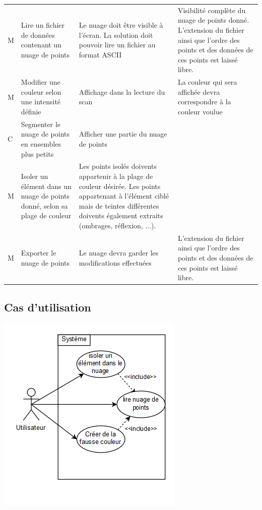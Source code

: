 \documentclass[12pt,titlepage,french]{article}
\begin{document}
\noindent\begin{tabu} to \toprule
     &&&\\\toprule
M &Lire un fichier de données contenant un nuage de points
& Le nuage doit être visible à l'écran. La solution doit pouvoir lire un fichier au format ASCII
& Visibilité complète du nuage de points donné. L'extension du fichier ainsi que l'ordre des points et des données de ces points est laissé libre.\\\midrule
M & Modifier une couleur selon une intensité définie
& Affichage dans la lecture du scan
& La couleur qui sera affichée devra correspondre à la couleur voulue\\\midrule
C & Segmenter le nuage de points en ensembles plus petits
& Afficher une partie du nuage de points
& \\\midrule
M &Isoler un élément dans un nuage de points donné, selon sa plage de couleur 
& Les points isolés doivents appartenir à la plage de couleur désirée.
Les points appartenant à l'élément ciblé mais de teintes différentes doivents également extraits (ombrages, réflexion, ...).
& \\\midrule
M & Exporter le nuage de points
& Le nuage devra garder les modifications effectuées
& L'extension du fichier ainsi que l'ordre des points et des données de ces points est laissé libre.\\\bottomrule
\end{tabu}

\subsection*{Cas d'utilisation}

\begin{center}
    \includegraphics{usecase.PNG}
\end{center}
\end{document}
